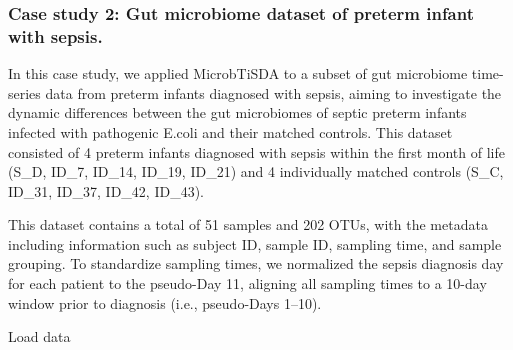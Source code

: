 \documentclass[
]{article}
\newenvironment{Shaded}{\begin{snugshade}}{\end{snugshade}}
\newcommand{\AttributeTok}[1]{\textcolor[rgb]{0.13,0.29,0.53}{#1}}
\newcommand{\CommentTok}[1]{\textcolor[rgb]{0.56,0.35,0.01}{\textit{#1}}}
\newcommand{\ConstantTok}[1]{\textcolor[rgb]{0.56,0.35,0.01}{#1}}
\newcommand{\DecValTok}[1]{\textcolor[rgb]{0.00,0.00,0.81}{#1}}
\newcommand{\FloatTok}[1]{\textcolor[rgb]{0.00,0.00,0.81}{#1}}
\newcommand{\FunctionTok}[1]{\textcolor[rgb]{0.13,0.29,0.53}{\textbf{#1}}}
\newcommand{\NormalTok}[1]{#1}
\newcommand{\OtherTok}[1]{\textcolor[rgb]{0.56,0.35,0.01}{#1}}
\newcommand{\SpecialCharTok}[1]{\textcolor[rgb]{0.81,0.36,0.00}{\textbf{#1}}}
\begin{document}
\begin{Shaded}
\end{Shaded}

\subsubsection{Case study 2: Gut microbiome dataset of preterm infant
with
sepsis.}\label{case-study-2-gut-microbiome-dataset-of-preterm-infant-with-sepsis.}

In this case study, we applied MicrobTiSDA to a subset of gut microbiome
time-series data from preterm infants diagnosed with sepsis, aiming to
investigate the dynamic differences between the gut microbiomes of
septic preterm infants infected with pathogenic E.coli and their matched
controls. This dataset consisted of 4 preterm infants diagnosed with
sepsis within the first month of life (S\_D, ID\_7, ID\_14, ID\_19,
ID\_21) and 4 individually matched controls (S\_C, ID\_31, ID\_37,
ID\_42, ID\_43).

This dataset contains a total of 51 samples and 202 OTUs, with the
metadata including information such as subject ID, sample ID, sampling
time, and sample grouping. To standardize sampling times, we normalized
the sepsis diagnosis day for each patient to the pseudo-Day 11, aligning
all sampling times to a 10-day window prior to diagnosis (i.e.,
pseudo-Days 1--10).

Load data
\end{document}
